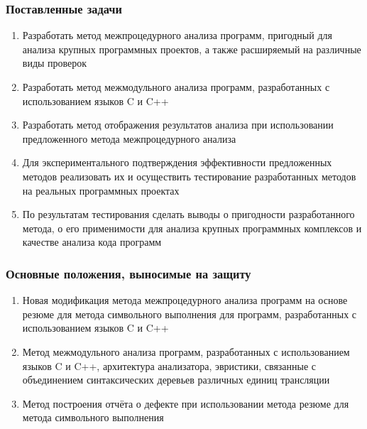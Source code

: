 \documentclass[hyperref={pdfpagelabels=false}]{beamer}
\begin{document}
\begin{frame}[allowframebreaks]
\frametitle{Поставленные задачи}
\begin{enumerate}
  \item Разработать метод межпроцедурного анализа программ, пригодный для анализа крупных программных проектов, а также расширяемый на различные виды проверок
  \item Разработать метод межмодульного анализа программ, разработанных с использованием языков C и C++
  \item Разработать метод отображения результатов анализа при использовании предложенного метода межпроцедурного анализа
  \item Для экспериментального подтверждения эффективности предложенных методов реализовать их и осуществить тестирование разработанных методов на реальных программных проектах
  \item По результатам тестирования сделать выводы о пригодности разработанного метода, о его применимости для анализа крупных программных комплексов и качестве анализа кода программ
\end{enumerate}
\end{frame}

\begin{frame}[allowframebreaks]
\frametitle{Основные положения, выносимые на защиту}
\begin{enumerate}
  \item Новая модификация метода межпроцедурного анализа программ на основе резюме для метода символьного выполнения для программ, разработанных с использованием языков C и C++
  \item Метод межмодульного анализа программ, разработанных с использованием языков C и C++, архитектура анализатора, эвристики, связанные с объединением синтаксических деревьев различных единиц трансляции
  \item Метод построения отчёта о дефекте при использовании метода резюме для метода символьного выполнения
\end{enumerate}
\end{frame}
\end{document}
